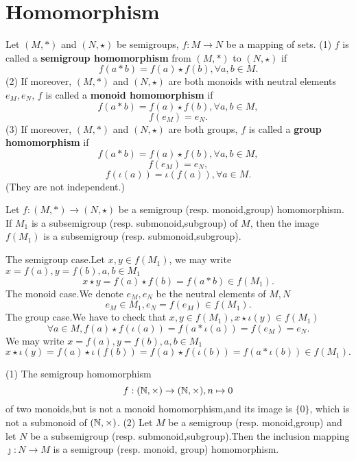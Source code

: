 \documentclass{book}
\numberwithin{equation}{section}
\begin{document}
\section{Homomorphism}
\begin{definitionenv}
    Let $(M,*)$ and $(N,\star)$ be  semigroups, $f:M\rightarrow N$ be a mapping of sets.
    \newline
    (1) $f$ is called a \textbf{semigroup homomorphism} from $(M,*)$ to $(N,\star)$ if
    $$f(a*b)=f(a)\star f(b),\forall a,b\in M.$$
    (2) If moreover, $(M,*)$ and $(N,\star)$ are both monoids with neutral elements $e_M,e_N$, $f$ is called a \textbf{monoid homomorphism} if 
     $$f(a*b)=f(a)\star f(b),\forall a,b\in M,$$ 
     $$f(e_M)=e_N.$$
    (3) If moreover, $(M,*)$ and $(N,\star)$ are both groups, $f$ is called a \textbf{group homomorphism} if 
    $$f(a*b)=f(a)\star f(b),\forall a,b\in M,$$
    $$f(e_M)=e_N,$$
    $$f(\iota(a))=\iota(f(a)),\forall a\in M.$$
    (They are not independent.)
\end{definitionenv}
\begin{propositionenv}
    \quad 
    \newline
    Let $f:(M,*)\rightarrow (N,\star)$ be a semigroup (resp. monoid,group) homomorphism. If $M_1$ is a subsemigroup (resp. submonoid,subgroup) of $M$, then the image $f(M_1)$ is a subsemigroup (resp. submonoid,subgroup).
\end{propositionenv}
\begin{proofenv}
    The semigroup case.Let $x,y\in f(M_1)$, we may write $x=f(a),y=f(b),a,b\in M_1$
    $$x\star y=f(a)\star f(b)=f(a*b)\in f(M_1).$$
    The monoid case.We denote $e_M,e_N$ be the neutral elements of $M,N$
    $$e_M\in M_1,e_N=f(e_M)\in f(M_1).$$
    The group case.We have to check that $x,y\in f(M_1),x\star \iota(y)\in f(M_1)$
    $$\forall a\in M, f(a)\star f(\iota(a))=f(a*\iota(a))=f(e_M)=e_N.$$
    We may write $x=f(a),y=f(b),a,b\in M_1$
    $$x\star \iota(y)=f(a)\star\iota(f(b))=f(a)\star f(\iota(b))=f(a*\iota(b))\in f(M_1).$$
\end{proofenv}
\begin{remark}
    \quad
    \newline
    (1) The semigroup homomorphism
    $$f:(\mathbb{N},\times)\rightarrow (\mathbb{N},\times),n\mapsto 0$$
    of two monoids,but is not a monoid homomorphism,and its image is $\{0\}$, which is not a submonoid of $(\mathbb{N},\times)$.
    \newline
    (2) Let $M$ be a semigroup (resp. monoid,group) and let $N$ be a subsemigroup (resp. submonoid,subgroup).Then the inclusion mapping $\jmath :N\rightarrow M$ is a semigroup (resp. monoid, group) homomorphism.
\end{remark}
\end{document}
